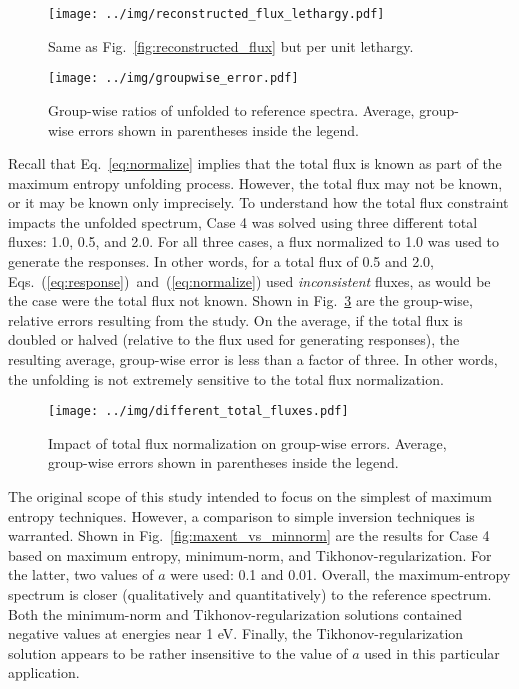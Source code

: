 \documentclass[journal]{IEEEtran}
\newcommand{\FIG}[1]{Fig.~\ref{#1}}               %
\begin{document}
\begin{figure}[h!tb]
  \centering
  \texttt{[image: ../img/reconstructed\_flux\_lethargy.pdf]}
  \caption{Same as \FIG{fig:reconstructed_flux} but per unit lethargy.}
  \label{fig:reconstructed_flux_lethargy}
\end{figure}

\begin{figure}[h!tb]
  \centering
  \texttt{[image: ../img/groupwise\_error.pdf]}
  \caption{Group-wise ratios of unfolded to 
  reference spectra.  Average, group-wise errors shown in parentheses inside the legend.}
  \label{fig:error}
\end{figure}


Recall that Eq.~\ref{eq:normalize} implies that the total flux is known as part of the maximum entropy unfolding process.  However, the total flux may not be known, or it may be known only imprecisely.  To understand how the total flux constraint impacts the unfolded spectrum, Case 4 was solved using three different total fluxes: 1.0, 0.5, and 2.0.  For all three cases, a flux normalized to 1.0 was used to generate the responses.  In other words, for a total flux of 0.5 and 2.0, Eqs.~(\ref{eq:response})~and~(\ref{eq:normalize}) used {\it inconsistent} fluxes, as would be the case were the total flux not known.  Shown in \FIG{fig:different_total_fluxes} are the group-wise, relative errors resulting from the study.  On the average, if the total flux is doubled or halved (relative to the flux used for generating responses), the resulting average, group-wise error is less than a factor of three.  In other words, the unfolding is not extremely sensitive to the total flux normalization.

\begin{figure}[h!tb]
  \centering
  \texttt{[image: ../img/different\_total\_fluxes.pdf]}
  \caption{Impact of total flux normalization on group-wise errors.  Average, group-wise errors shown in parentheses inside the legend.}
  \label{fig:different_total_fluxes}
\end{figure}

The original scope of this study intended to focus on the simplest of maximum entropy techniques.  However, a comparison to simple inversion techniques is warranted.  Shown in \FIG{fig:maxent_vs_minnorm} are the results for Case 4 based on maximum entropy, minimum-norm, and Tikhonov-regularization.  For the latter, two values of $a$ were used: 0.1 and 0.01.  Overall, the maximum-entropy spectrum is closer (qualitatively and quantitatively) to the reference spectrum.  Both the minimum-norm and Tikhonov-regularization solutions contained negative values at energies near 1 eV.  Finally, the Tikhonov-regularization solution appears to be rather insensitive to the value of $a$ used in this particular application.  
\end{document}
